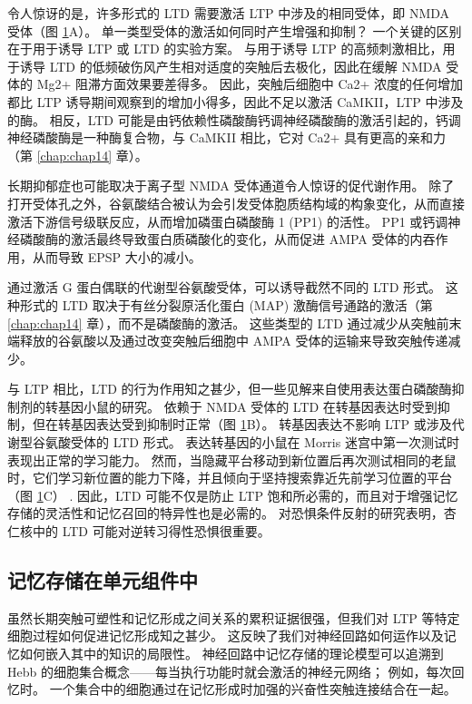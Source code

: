 \begin{figure}[htbp]
	\label{fig:54_10}
\end{figure}

令人惊讶的是，许多形式的 LTD 需要激活 LTP 中涉及的相同受体，即 NMDA 受体（图 \ref{fig:54_10}A）。 单一类型受体的激活如何同时产生增强和抑制？ 一个关键的区别在于用于诱导 LTP 或 LTD 的实验方案。 与用于诱导 LTP 的高频刺激相比，用于诱导 LTD 的低频破伤风产生相对适度的突触后去极化，因此在缓解 NMDA 受体的 Mg2+ 阻滞方面效果要差得多。 因此，突触后细胞中 Ca2+ 浓度的任何增加都比 LTP 诱导期间观察到的增加小得多，因此不足以激活 CaMKII，LTP 中涉及的酶。 相反，LTD 可能是由钙依赖性磷酸酶钙调神经磷酸酶的激活引起的，钙调神经磷酸酶是一种酶复合物，与 CaMKII 相比，它对 Ca2+ 具有更高的亲和力（第 \ref{chap:chap14} 章）。

长期抑郁症也可能取决于离子型 NMDA 受体通道令人惊讶的促代谢作用。 除了打开受体孔之外，谷氨酸结合被认为会引发受体胞质结构域的构象变化，从而直接激活下游信号级联反应，从而增加磷蛋白磷酸酶 1 (PP1) 的活性。 PP1 或钙调神经磷酸酶的激活最终导致蛋白质磷酸化的变化，从而促进 AMPA 受体的内吞作用，从而导致 EPSP 大小的减小。

通过激活 G 蛋白偶联的代谢型谷氨酸受体，可以诱导截然不同的 LTD 形式。 这种形式的 LTD 取决于有丝分裂原活化蛋白 (MAP) 激酶信号通路的激活（第 \ref{chap:chap14} 章），而不是磷酸酶的激活。 这些类型的 LTD 通过减少从突触前末端释放的谷氨酸以及通过改变突触后细胞中 AMPA 受体的运输来导致突触传递减少。

与 LTP 相比，LTD 的行为作用知之甚少，但一些见解来自使用表达蛋白磷酸酶抑制剂的转基因小鼠的研究。 依赖于 NMDA 受体的 LTD 在转基因表达时受到抑制，但在转基因表达受到抑制时正常（图 \ref{fig:54_10}B）。 转基因表达不影响 LTP 或涉及代谢型谷氨酸受体的 LTD 形式。 表达转基因的小鼠在 Morris 迷宫中第一次测试时表现出正常的学习能力。 然而，当隐藏平台移动到新位置后再次测试相同的老鼠时，它们学习新位置的能力下降，并且倾向于坚持搜索靠近先前学习位置的平台（图 \ref{fig:54_10}C） . 因此，LTD 可能不仅是防止 LTP 饱和所必需的，而且对于增强记忆存储的灵活性和记忆召回的特异性也是必需的。 对恐惧条件反射的研究表明，杏仁核中的 LTD 可能对逆转习得性恐惧很重要。

\subsection{记忆存储在单元组件中}

虽然长期突触可塑性和记忆形成之间关系的累积证据很强，但我们对 LTP 等特定细胞过程如何促进记忆形成知之甚少。 这反映了我们对神经回路如何运作以及记忆如何嵌入其中的知识的局限性。 神经回路中记忆存储的理论模型可以追溯到 Hebb 的细胞集合概念——每当执行功能时就会激活的神经元网络； 例如，每次回忆时。 一个集合中的细胞通过在记忆形成时加强的兴奋性突触连接结合在一起。

